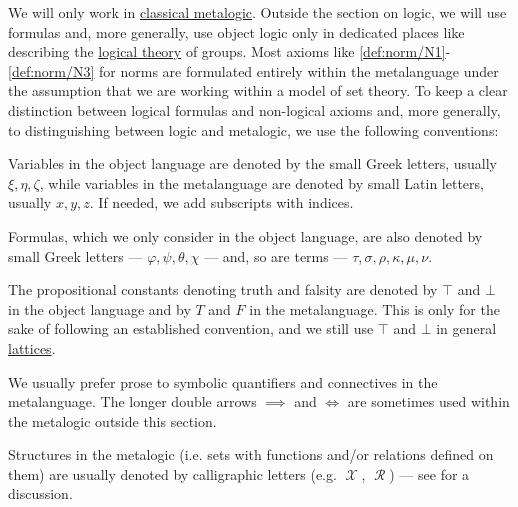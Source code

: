 \begin{remark}\label{rem:mathematical_logic_conventions}
  We will only work in \hyperref[def:propositional_derivation_system]{classical metalogic}. Outside the section on logic, we will use formulas and, more generally, use object logic only in dedicated places like  describing the \hyperref[def:first_order_theory]{logical theory} of groups. Most axioms like \ref{def:norm/N1}-\ref{def:norm/N3} for norms are formulated entirely within the metalanguage under the assumption that we are working within a model of set theory. To keep a clear distinction between logical formulas and non-logical axioms and, more generally, to distinguishing between logic and metalogic, we use the following conventions:

  \begin{thmenum}
     Variables in the object language are denoted by the small Greek letters, usually \( \xi, \eta, \zeta \), while variables in the metalanguage are denoted by small Latin letters, usually \( x, y, z \). If needed, we add subscripts with indices.

     Formulas, which we only consider in the object language, are also denoted by small Greek letters --- \( \varphi, \psi, \theta, \chi \) --- and, so are terms --- \( \tau, \sigma, \rho, \kappa, \mu, \nu \).

     The propositional constants denoting truth and falsity are denoted by \( \top \) and \( \bot \) in the object language and by \( T \) and \( F \) in the metalanguage. This is only for the sake of following an established convention, and we still use \( \top \) and \( \bot \) in general \hyperref[def:semilattice/lattice]{lattices}.

     We usually prefer prose to symbolic quantifiers and connectives in the metalanguage. The longer double arrows \( \implies \) and \( \iff \) are sometimes used within the metalogic outside this section.

     Structures in the metalogic (i.e. sets with functions and/or relations defined on them) are usually denoted by calligraphic letters (e.g. \( \mscrX \), \( \mscrR \)) --- see  for a discussion.


\end{thmenum}
\end{remark}
